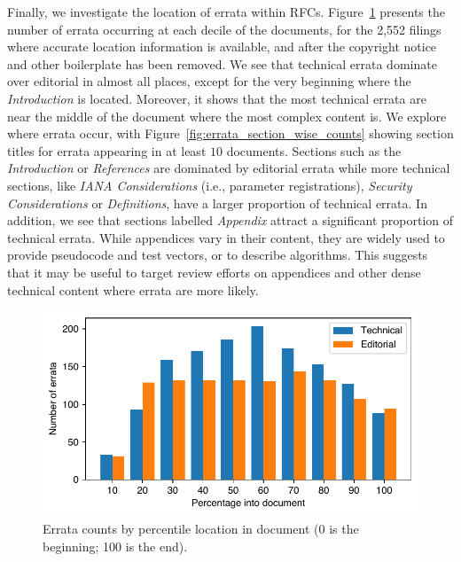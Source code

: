 \documentclass[twocolumn,10pt]{article}
\newlength{\figureWidthOneColumn}
\newcommand{\pb}[1]{\vspace{0.75ex}\noindent{\textbf{#1}}}
\begin{document}
\pb{Errata Location:}
Finally, we investigate the location of errata within RFCs.
Figure~\ref{fig:errata_location_percent_count} presents the number of
errata occurring at each decile of the documents, for the 2,552 filings
where accurate location information is available, and after the copyright
notice and other boilerplate has been removed.  We see that technical
errata dominate over editorial in almost all places, except for the very
beginning where the \textit{Introduction} is located. Moreover, it shows
that the most technical errata are near the middle of the document where
the most complex content is.  We explore where errata occur, with
Figure~\ref{fig:errata_section_wise_counts} showing section titles for
errata appearing in at least $10$ documents. Sections such as the
\emph{Introduction} or \textit{References} are dominated by editorial
errata while more technical sections, like \emph{IANA Considerations} (i.e.,
parameter registrations), \emph{Security Considerations} or
\emph{Definitions}, have a larger proportion of technical errata. In
addition, we see that sections labelled \emph{Appendix} attract a
significant proportion of technical errata. While appendices vary in their
content, they are widely used to provide pseudocode and test vectors, or to
describe algorithms. This suggests that it may be useful to target review
efforts on appendices and other dense technical content where errata are
more likely.

\begin{figure}
  \centering
  \includegraphics[width=\figureWidthOneColumn]{figures-prev/tma-2023/location-percent.pdf}
  \caption{
    Errata counts by percentile location in document (0 is the beginning;
    100 is the end).
  }
  \label{fig:errata_location_percent_count}
\end{figure}
\end{document}
